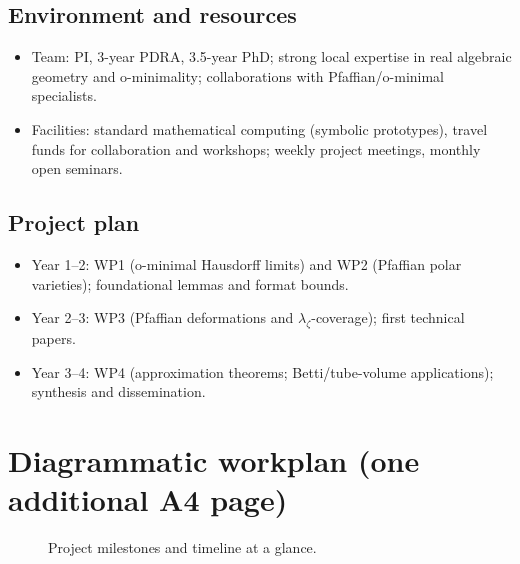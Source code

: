 \documentclass[11pt,a4paper]{article}
\begin{document}
\subsection*{Environment and resources}
\begin{itemize}
  \item Team: PI, 3-year PDRA, 3.5-year PhD; strong local expertise in real algebraic geometry and o-minimality; collaborations with Pfaffian/o-minimal specialists.
  \item Facilities: standard mathematical computing (symbolic prototypes), travel funds for collaboration and workshops; weekly project meetings, monthly open seminars.
\end{itemize}

\subsection*{Project plan}
\begin{itemize}
  \item Year 1--2: WP1 (o-minimal Hausdorff limits) and WP2 (Pfaffian polar varieties); foundational lemmas and format bounds.
  \item Year 2--3: WP3 (Pfaffian deformations and \(\lambda_\zeta\)-coverage); first technical papers.
  \item Year 3--4: WP4 (approximation theorems; Betti/tube-volume applications); synthesis and dissemination.
\end{itemize}

\clearpage
\section*{Diagrammatic workplan (one additional A4 page)}
\begin{figure}[h]
  \centering
  \caption{Project milestones and timeline at a glance.}
\end{figure}
\end{document}
